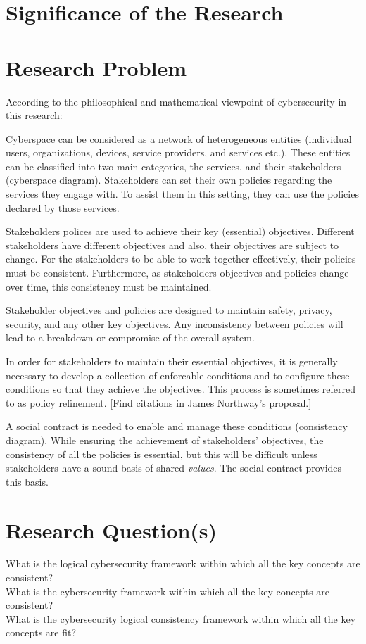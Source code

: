 \section{Significance of the Research}
\section{Research Problem}
According to the philosophical and mathematical viewpoint of cybersecurity in this research:

Cyberspace can be considered as a network of heterogeneous entities
(individual users, organizations, devices, service providers, and
services etc.). These entities can be classified into two main categories,
the services, and their stakeholders (cyberspace diagram).  Stakeholders
can set their own policies regarding the services they engage with. To
assist them in this setting, they can use the policies declared by
those services.

Stakeholders polices are used to achieve their key (essential)
objectives. Different stakeholders have different objectives and also,
their objectives are subject to change.  For the stakeholders to be
able to work together effectively, their policies must be consistent.
Furthermore, as stakeholders objectives and policies change over time,
this consistency must be maintained.

Stakeholder objectives and policies are designed to maintain safety, privacy, security,
and any other key objectives. Any inconsistency between policies will lead
to a breakdown or compromise of the overall system.

In order for stakeholders to maintain their essential objectives, it is
generally necessary to develop a collection of enforcable conditions and to configure these conditions so that they achieve the objectives. This process is sometimes referred to as policy refinement. [Find citations in James Northway's
proposal.]

A social contract is needed to enable and manage these conditions (consistency diagram).  While ensuring the achievement of stakeholders’ objectives, the consistency of all the policies is essential, but this will be difficult unless stakeholders have a sound basis of shared {\em values}. The social contract provides this basis.
\section{Research Question(s)}
\if
What is the logical cybersecurity framework within which all the key concepts are consistent?\\
What is the cybersecurity framework within which all the key concepts are consistent?\\
What is the cybersecurity logical consistency framework within which all the key concepts are fit?\\
\fi

